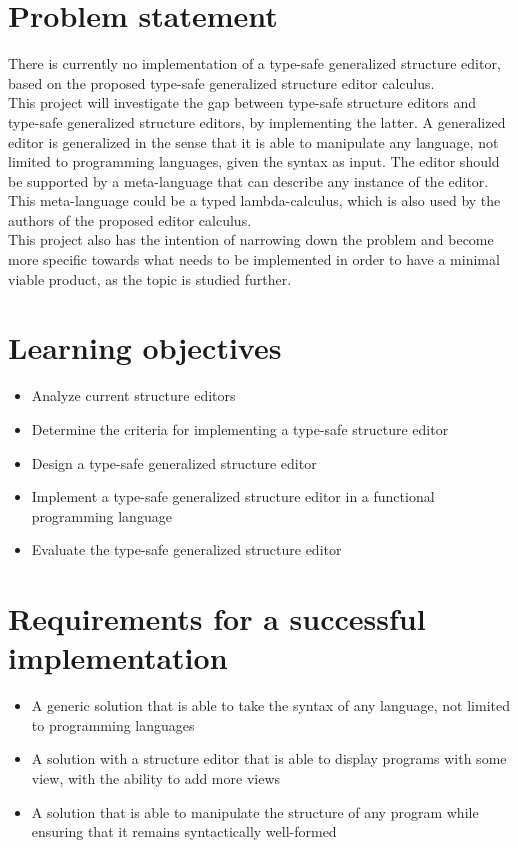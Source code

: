 \documentclass{article}
\begin{document}
\section{Problem statement}
There is currently no implementation of a type-safe generalized structure editor, based on the proposed type-safe generalized structure editor calculus.
\\

This project will investigate the gap between type-safe structure editors and type-safe generalized structure editors, by implementing the latter. A generalized editor is generalized in the sense that it is able to manipulate any language, not limited to programming languages, given the syntax as input. The editor should be supported by a meta-language that can describe any instance of the editor. This meta-language could be a typed lambda-calculus, which is also used by the authors of the proposed editor calculus.
\\

This project also has the intention of narrowing down the problem and become more specific towards what needs to be implemented in order to have a minimal viable product, as the topic is studied further.

\section{Learning objectives}
\begin{itemize}
    \item Analyze current structure editors
    \item Determine the criteria for implementing a type-safe structure editor
    \item Design a type-safe generalized structure editor
    \item Implement a type-safe generalized structure editor in a functional programming language
    \item Evaluate the type-safe generalized structure editor
\end{itemize}

\section{Requirements for a successful implementation}
\begin{itemize}
    \item A generic solution that is able to take the syntax of any language, not limited to programming languages
    \item A solution with a structure editor that is able to display programs with some view, with the ability to add more views
    \item A solution that is able to manipulate the structure of any program while ensuring that it remains syntactically well-formed
\end{itemize}

\printbibliography
\end{document}
